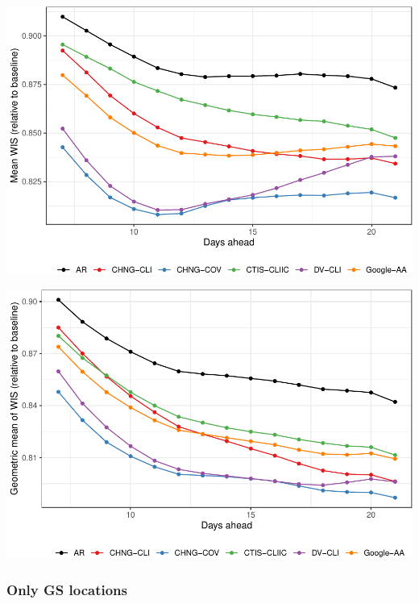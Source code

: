 \documentclass[9pt,twoside,lineno]{pnas-new}
\begin{document}
\begin{center}\includegraphics[width=\linewidth]{fig/fcast-alldates-1} \end{center}

\begin{center}\includegraphics[width=\linewidth]{fig/fcast-alldates-adjusted-1} \end{center}

\hypertarget{only-gs-locations}{%
\subsubsection{Only GS locations}\label{only-gs-locations}}
\end{document}
